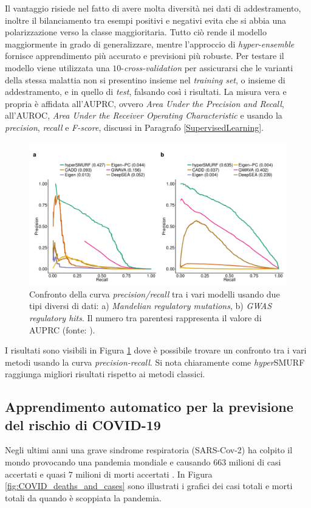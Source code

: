 \documentclass[12pt,italian]{report}
\begin{document}
	Il vantaggio risiede nel fatto di avere molta diversità nei dati di addestramento, inoltre il bilanciamento tra esempi positivi e negativi evita che si abbia una polarizzazione verso la classe maggioritaria. Tutto ciò rende il modello maggiormente in grado di generalizzare, mentre l'approccio di \textit{hyper-ensemble} fornisce apprendimento più accurato e previsioni più robuste.
	Per testare il modello viene utilizzata una $10$-\textit{cross-validation} per assicurarsi che le varianti della stessa malattia non si presentino insieme nel \textit{training set}, o insieme di addestramento, e in quello di \textit{test}, falsando così i risultati. La misura vera e propria è affidata all'AUPRC, ovvero \textit{Area Under the Precision and Recall}, all'AUROC, \textit{Area Under the Receiver Operating Characteristic} e usando la \textit{precision}, \textit{recall} e \textit{F-score}, discussi in Paragrafo \ref{SupervisedLearning}.
	
	\begin{figure}[h]
		\centering
		\includegraphics[width=0.8\linewidth]{immagini/ResultHyperSMURF}
		\caption{Confronto della curva \textit{precision/recall} tra i vari modelli usando due tipi diversi di dati: a) \textit{Mandelian regulatory mutations}, b) \textit{GWAS regulatory hits}. Il numero tra parentesi rappresenta il valore di AUPRC (fonte: \cite{Schubach2017}).}
		\label{fig:resulthypersmurf}
	\end{figure}

	I risultati sono visibili in Figura \ref{fig:resulthypersmurf} dove è possibile trovare un confronto tra i vari metodi usando la curva \textit{precision-recall}. Si nota chiaramente come \textit{hyper}SMURF raggiunga migliori risultati rispetto ai metodi classici.
	
	
	\subsection{Apprendimento automatico per la previsione del rischio di COVID-19}
	Negli ultimi anni una grave sindrome respiratoria (SARS-Cov-2) ha colpito il mondo provocando una pandemia mondiale e causando $663$ milioni di casi accertati e quasi $7$ milioni di morti accertati \cite{covidDeath}. In Figura \ref{fig:COVID_deaths_and_cases} sono illustrati i grafici dei casi totali e morti totali da quando è scoppiata la pandemia.
\end{document}
